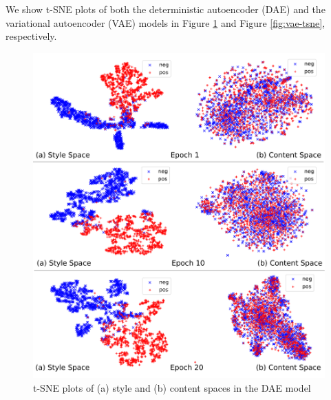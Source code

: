 We show t-SNE plots of both the deterministic autoencoder (DAE) and the variational autoencoder (VAE) models in Figure \ref{fig:dae-tsne} and Figure \ref{fig:vae-tsne}, respectively.

\begin{figure}[ht]
	\includegraphics[width=\linewidth]{images/dae-latent-spaces}
	\caption{t-SNE plots of (a) style and (b) content spaces in the DAE model}
	\label{fig:dae-tsne}
\end{figure}

